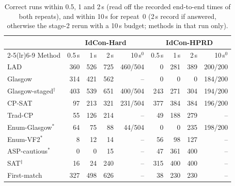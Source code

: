 \begin{table}[t]
\caption{Correct runs within 0.5, 1 and 2\,s (read off the recorded end-to-end times of both repeats), and within 10\,s for repeat~0 (2\,s record if answered, otherwise the stage-2 rerun with a 10\,s budget; methods in that run only).}
\label{tab:budget}
\centering\footnotesize
\setlength{\tabcolsep}{1.9pt}
\begin{tabular}{lrrrr rrrr}
\toprule
 & \multicolumn{4}{c}{IdCon-Hard} & \multicolumn{4}{c}{IdCon-HPRD}\\
\cmidrule(lr){2-5}\cmidrule(lr){6-9}
Method & 0.5\,s & 1\,s & 2\,s & 10\,s$^{0}$ & 0.5\,s & 1\,s & 2\,s & 10\,s$^{0}$\\
\midrule
LAD & 360 & 526 & 725 & 460/504 & 0 & 281 & 389 & 200/200\\
Glasgow & 314 & 421 & 562 & -- & 0 & 0 & 0 & 184/200\\
Glasgow-staged$^\dagger$ & 403 & 539 & 651 & 400/504 & 243 & 271 & 304 & 194/200\\
CP-SAT & 97 & 213 & 321 & 231/504 & 377 & 384 & 384 & 196/200\\
Trad-CP & 55 & 126 & 214 & -- & 49 & 188 & 279 & --\\
Enum-Glasgow$^\ast$ & 64 & 75 & 88 & 44/504 & 0 & 0 & 235 & 198/200\\
Enum-VF2$^\ast$ & 8 & 12 & 14 & -- & 56 & 98 & 127 & --\\
ASP-cautious$^\ast$ & 0 & 0 & 15 & -- & 47 & 361 & 400 & --\\
SAT$^\ddagger$ & 16 & 24 & 240 & -- & 315 & 400 & 400 & --\\
\midrule
First-match & 327 & 498 & 626 & -- & 38 & 230 & 230 & --\\
\bottomrule
\end{tabular}
\end{table}

